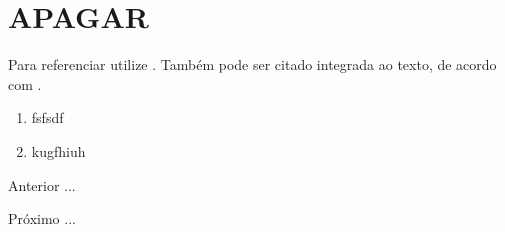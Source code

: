 \section{APAGAR}

Para referenciar utilize \cite{netBeans}. Também pode ser citado integrada ao texto, de acordo com .




\begin{enumerate}[label=\Roman{*}, ref=(\roman{*})]
  \item fsfsdf
  \item kugfhiuh
\end{enumerate}

\begin{asparaenum}
\item Anterior ... \cite{ninguem2022curioso}
\item Próximo ... \label{pl1}
\end{asparaenum}


